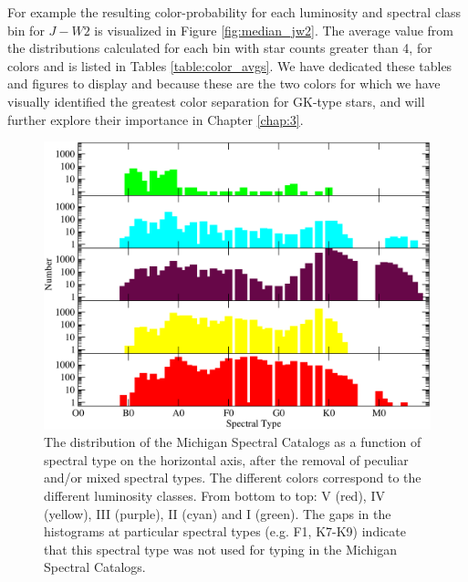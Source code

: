 For example the resulting color-probability for each luminosity and spectral class bin for $J-W{2}$ is visualized in Figure \ref{fig:median_jw2}. The average value from the distributions calculated for each bin with star counts greater than 4, for colors \jwtwo and \jwtwo is listed in Tables \ref{table:color_avgs}. We have dedicated these tables and figures to display \jwtwo and \jwtwo because these are the two colors for which we have visually identified the greatest color separation for GK-type stars, and will further explore their importance in Chapter \ref{chap:3}.


\begin{figure}[t]
    \label{fig:spt_michigan_hist}
    \centering
        \includegraphics[width=1.0\textwidth]{Figures/populations/hist-spt-count.pdf}
\caption{The distribution of the Michigan Spectral Catalogs as a function of spectral type on the horizontal axis, after the removal of peculiar and/or mixed spectral types.  The different colors correspond to the different luminosity classes.  From bottom to top: V (red), IV (yellow), III (purple), II (cyan) and I (green).  The gaps in the histograms at particular spectral types (e.g. F1, K7-K9) indicate that this spectral type was not used for typing in the Michigan Spectral Catalogs.}
\end{figure}

